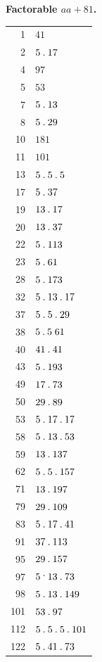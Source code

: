 %
\par{}
\begin{center}\textbf{Factorable $aa+81$.}\end{center}
\begingroup\small\setlength{\tabcolsep}{5pt}
\begin{longtable}{@{}r|l@{}}
1 & $41$\\
2 & $5\mathbin{.} 17$\\
4 & $97$\\
5 & $53$\\
7 & $5\mathbin{.} 13$\\
8 & $5\mathbin{.} 29$\\
10 & $181$\\
11 & $101$\\
13 & $5\mathbin{.} 5\mathbin{.} 5$\\
17 & $5\mathbin{.} 37$\\
19 & $13\mathbin{.} 17$\\
20 & $13\mathbin{.} 37$\\
22 & $5\mathbin{.} 113$\\
23 & $5\mathbin{.} 61$\\
28 & $5\mathbin{.} 173$\\
32 & $5\mathbin{.} 13\mathbin{.} 17$\\
37 & $5\mathbin{.} 5\mathbin{.} 29$\\
38 & $5\mathbin{.} 5\;61$\\
40 & $41\mathbin{.} 41$\\
43 & $5\mathbin{.} 193$\\
49 & $17\mathbin{.} 73$\\
50 & $29\mathbin{.} 89$\\
53 & $5\mathbin{.} 17\mathbin{.} 17$\\
58 & $5\mathbin{.} 13\mathbin{.} 53$\\
59 & $13\mathbin{.} 137$\\
62 & $5\mathbin{.} 5\mathbin{.} 157$\\
71 & $13\mathbin{.} 197$\\
79 & $29\mathbin{.} 109$\\
83 & $5\mathbin{.} 17\mathbin{.} 41$\\
91 & $37\mathbin{.} 113$\\
95 & $29\mathbin{.} 157$\\
97 & $5\mathbin{\raisebox{0.9ex}{.}}13\pdot 73$\\
98 & $5\mathbin{.} 13\mathbin{.} 149$\\
101 & $53\mathbin{.} 97$\\
112 & $5\mathbin{.} 5\mathbin{.} 5\mathbin{.} 101$\\
122 & $5\mathbin{.} 41\mathbin{.} 73$\\

\end{longtable}

